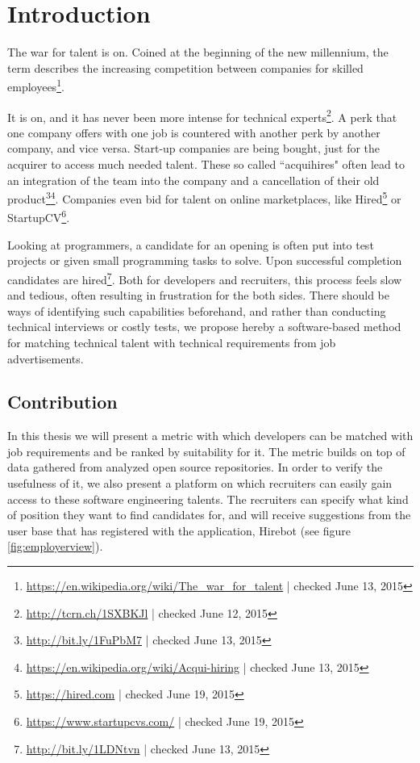 \chapter{Introduction}\label{ch:introduction}
The war for talent is on. Coined at the beginning of the new millennium, the term describes the increasing competition between companies for skilled employees\footnote{\url{https://en.wikipedia.org/wiki/The_war_for_talent} | checked June 13, 2015}.

It is on, and it has never been more intense for technical experts\footnote{\url{http://tcrn.ch/1SXBKJl} | checked June 12, 2015}. A perk that one company offers with one job is countered with another perk by another company, and vice versa. Start-up companies are being bought, just for the acquirer to access much needed talent. These so called ``acquihires" often lead to an integration of the team into the company and a cancellation of their old product\footnote{\url{http://bit.ly/1FuPbM7} | checked June 13, 2015}\footnote{\url{https://en.wikipedia.org/wiki/Acqui-hiring} | checked June 13, 2015}. Companies even bid for talent on online marketplaces, like Hired\footnote{\url{https://hired.com} | checked June 19, 2015} or StartupCV\footnote{\url{https://www.startupcvs.com/} | checked June 19, 2015}.


Looking at programmers, a candidate for an opening is often put into test projects or given small programming tasks to solve. Upon successful completion candidates are hired\footnote{\url{http://bit.ly/1LDNtvn} | checked June 13, 2015}. Both for developers and recruiters, this process feels slow and tedious, often resulting in frustration for the both sides. There should be ways of identifying such capabilities beforehand, and rather than conducting technical interviews or costly tests, we propose hereby a software-based method for matching technical talent with technical requirements from job advertisements.

\section{Contribution}
In this thesis we will present a metric with which developers can be matched with job requirements and be ranked by suitability for it. The metric builds on top of data gathered from analyzed open source repositories. In order to verify the usefulness of it, we also present a platform on which recruiters can easily gain access to these software engineering talents. The recruiters can specify what kind of position they want to find candidates for, and will receive suggestions from the user base that has registered with the application, Hirebot (see figure \ref{fig:employerview}).

